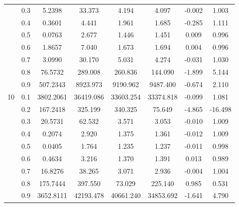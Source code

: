 \documentclass[11pt,a4paper]{report}
\begin{document}
\begin{longtable}{ | c | c || c | c | c | c | c | c | }
 & 0.3 & 5.2398 & 33.373 & 4.194 & 4.097 & -0.002 & 1.003 \\
 & 0.4 & 0.3601 & 4.441 & 1.961 & 1.685 & -0.285 & 1.111 \\
 & 0.5 & 0.0763 & 2.677 & 1.446 & 1.451 & 0.009 & 0.996 \\
 & 0.6 & 1.8657 & 7.040 & 1.673 & 1.694 & 0.004 & 0.996 \\
 & 0.7 & 3.0990 & 30.170 & 5.031 & 4.274 & -0.031 & 1.030 \\
 & 0.8 & 76.5732 & 289.008 & 260.836 & 144.090 & -1.899 & 5.144 \\
 & 0.9 & 507.2343 & 8923.973 & 9190.962 & 9487.400 & -0.674 & 2.110 \\
 \hline
\multirow{9}{*}{10} & 0.1 & 3802.2061 & 36419.086 & 33603.254 & 33374.818 & -0.099 & 1.081 \\
 & 0.2 & 167.2418 & 325.199 & 340.325 & 75.649 & -4.865 & -16.498 \\
 & 0.3 & 20.5731 & 62.532 & 3.571 & 3.053 & -0.010 & 1.009 \\
 & 0.4 & 0.2074 & 2.920 & 1.375 & 1.361 & -0.012 & 1.009 \\
 & 0.5 & 0.0405 & 1.764 & 1.235 & 1.237 & -0.011 & 0.998 \\
 & 0.6 & 0.4634 & 3.216 & 1.370 & 1.391 & 0.013 & 0.989 \\
 & 0.7 & 16.8276 & 38.265 & 3.071 & 2.936 & -0.004 & 1.004 \\
 & 0.8 & 175.7444 & 397.550 & 73.029 & 225.140 & 0.985 & 0.531 \\
 & 0.9 & 3652.8111 & 42193.478 & 40661.240 & 34853.692 & -1.641 & 4.790 \\
 \hline
\hline
\end{longtable}
\end{document}

